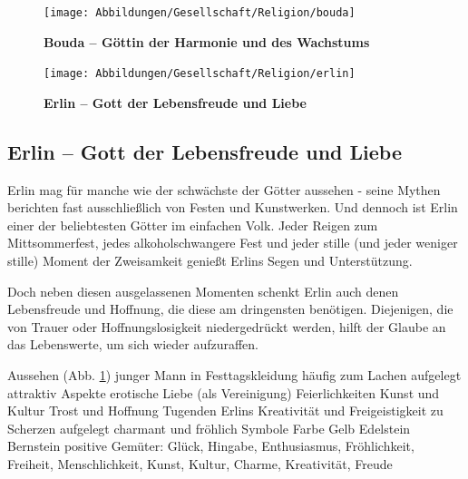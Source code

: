 \begin{figure}[tbh]
	\begin{minipage}{0.44\textwidth}
		\centering
		\texttt{[image: Abbildungen/Gesellschaft/Religion/bouda]}
		\captionsetup{width=0.95\linewidth}
		\caption[Bouda -- Göttin der Harmonie und des Wachstums]{\textbf{Bouda -- Göttin der Harmonie und des Wachstums}}
		\label{fig:bouda}
	\end{minipage}
	\hfill
	\begin{minipage}{0.54\textwidth}
		\centering
		\texttt{[image: Abbildungen/Gesellschaft/Religion/erlin]}
		\captionsetup{width=0.95\linewidth}
		\caption[Erlin -- Gott der Lebensfreude und Liebe]{\textbf{Erlin -- Gott der Lebensfreude und Liebe}}
		\label{fig:erlin}
	\end{minipage}
\end{figure}



\subsection{Erlin -- Gott der Lebensfreude und Liebe}
Erlin mag für manche wie der schwächste der Götter aussehen - seine Mythen berichten fast ausschließlich von Festen und Kunstwerken. 
Und dennoch ist Erlin einer der beliebtesten Götter im einfachen Volk. 
Jeder Reigen zum Mittsommerfest, jedes alkoholschwangere Fest und jeder stille (und jeder weniger stille) Moment der Zweisamkeit genießt Erlins Segen und Unterstützung.

Doch neben diesen ausgelassenen Momenten schenkt Erlin auch denen Lebensfreude und Hoffnung, die diese am dringensten benötigen. 
Diejenigen, die von Trauer oder Hoffnungslosigkeit niedergedrückt werden, hilft der Glaube an das Lebenswerte, um sich wieder aufzuraffen.
\begin{outline}
	\1 Aussehen (Abb. \ref{fig:erlin})
		\2 junger Mann in Festtagskleidung
		\2 häufig zum Lachen aufgelegt
		\2 attraktiv 
	\1 Aspekte
		\2 erotische Liebe (als Vereinigung)
		\2 Feierlichkeiten
		\2 Kunst und Kultur
		\2 Trost und Hoffnung
	\1 Tugenden Erlins
		\2 Kreativität und Freigeistigkeit
		\2 zu Scherzen aufgelegt
		\2 charmant und fröhlich
	\1 Symbole
		\2 Farbe Gelb
		\2 Edelstein Bernstein
	\1 positive Gemüter: Glück, Hingabe, Enthusiasmus, Fröhlichkeit, Freiheit, Menschlichkeit, Kunst, Kultur, Charme, Kreativität, Freude
\end{outline}

